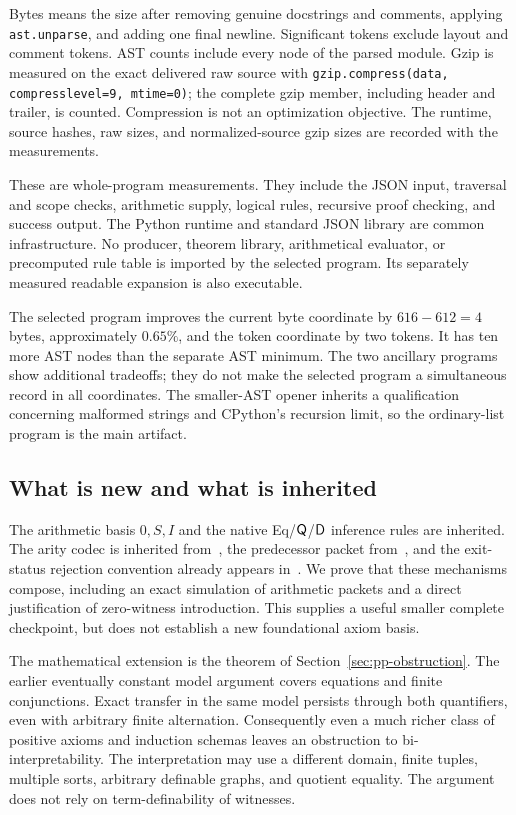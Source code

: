 Bytes means the size after removing genuine docstrings and comments,
applying \texttt{ast.unparse}, and adding one final newline. Significant
tokens exclude layout and comment tokens. AST counts include every node
of the parsed module. Gzip is measured on the exact delivered raw source
with \texttt{gzip.compress(data, compresslevel=9, mtime=0)}; the complete
gzip member, including header and trailer, is counted. Compression is
not an optimization objective. The runtime, source hashes, raw sizes,
and normalized-source gzip sizes are recorded with the measurements.

These are whole-program measurements. They include the JSON input,
traversal and scope checks, arithmetic supply, logical rules, recursive
proof checking, and success output. The Python runtime and standard JSON
library are common infrastructure. No producer, theorem library,
arithmetical evaluator, or precomputed rule table is imported by the
selected program. Its separately measured readable expansion is also
executable.

The selected program improves the current byte coordinate by
$616-612=4$ bytes, approximately $0.65\%$, and the token coordinate by
two tokens. It has ten more AST nodes than the separate AST minimum.
The two ancillary programs show additional tradeoffs; they do not make
the selected program a simultaneous record in all coordinates.
The smaller-AST opener inherits a qualification concerning malformed
strings and CPython's recursion limit, so the ordinary-list program is
the main artifact.

\subsection{What is new and what is inherited}

The arithmetic basis $0,S,I$ and the native Eq/$\mathsf Q$/$\mathsf D$ inference
rules are inherited. The arity codec is inherited from~\cite{arity},
the predecessor packet from~\cite{uniform}, and the exit-status
rejection convention already appears in~\cite{uniform}. We prove that
these mechanisms compose, including an exact simulation of arithmetic
packets and a direct justification of zero-witness introduction.
This supplies a useful smaller complete checkpoint, but does not
establish a new foundational axiom basis.

The mathematical extension is the theorem of
Section~\ref{sec:pp-obstruction}. The earlier eventually constant model
argument covers equations and finite conjunctions. Exact transfer in
the same model persists through both quantifiers, even with arbitrary
finite alternation. Consequently even a much richer class of positive
axioms and induction schemas leaves an obstruction to
bi-interpretability. The interpretation may use a different domain,
finite tuples, multiple sorts, arbitrary definable graphs, and quotient
equality. The argument does not rely on term-definability of witnesses.

